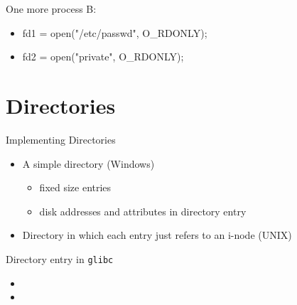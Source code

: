 \begin{frame}
  \begin{iblock}{One more process B:}\ttfamily
    \begin{itemize}
    \item[] fd1 = open("/etc/passwd", O\_RDONLY);
    \item[] fd2 = open("private", O\_RDONLY);
    \end{itemize}
  \end{iblock}
  \begin{center}
  \end{center}
\end{frame}

\section{Directories}

\begin{frame}{Implementing Directories}
  \begin{center}
  \end{center}
  \begin{itemize}
  \item[(a)] A simple directory (Windows)
    \begin{itemize}
    \item fixed size entries
    \item disk addresses and attributes in directory entry
    \end{itemize}
  \item[(b)] Directory in which each entry just refers to an i-node (UNIX)
  \end{itemize}
\end{frame}

\begin{frame}%
  \begin{iblock}{Directory entry in \texttt{glibc}}
  \end{iblock}
  \begin{itemize}
  \item[\$] 
  \item[\$] 
  \end{itemize}
\end{frame}

